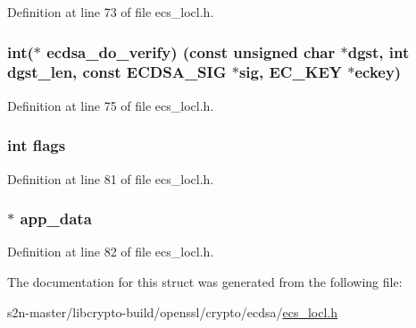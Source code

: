 Definition at line 73 of file ecs\+\_\+locl.\+h.

\subsubsection[{\texorpdfstring{ecdsa\+\_\+do\+\_\+verify}{ecdsa_do_verify}}]{\setlength{\rightskip}{0pt plus 5cm}int($\ast$ ecdsa\+\_\+do\+\_\+verify) (const unsigned char $\ast$dgst, int dgst\+\_\+len, const {\bf E\+C\+D\+S\+A\+\_\+\+S\+IG} $\ast$sig, {\bf E\+C\+\_\+\+K\+EY} $\ast$eckey)}\hypertarget{structecdsa__method_a0a6423be97171faf0d261d54e61f0abb}{}\label{structecdsa__method_a0a6423be97171faf0d261d54e61f0abb}


Definition at line 75 of file ecs\+\_\+locl.\+h.

\subsubsection[{\texorpdfstring{flags}{flags}}]{\setlength{\rightskip}{0pt plus 5cm}int flags}\hypertarget{structecdsa__method_ac8bf36fe0577cba66bccda3a6f7e80a4}{}\label{structecdsa__method_ac8bf36fe0577cba66bccda3a6f7e80a4}


Definition at line 81 of file ecs\+\_\+locl.\+h.

\subsubsection[{\texorpdfstring{app\+\_\+data}{app_data}}]{$\ast$ app\+\_\+data}\hypertarget{structecdsa__method_a02f2e20ee9163913d729eb922b3c672a}{}\label{structecdsa__method_a02f2e20ee9163913d729eb922b3c672a}


Definition at line 82 of file ecs\+\_\+locl.\+h.



The documentation for this struct was generated from the following file\+:\begin{DoxyCompactItemize}
\item 
s2n-\/master/libcrypto-\/build/openssl/crypto/ecdsa/\hyperlink{ecs__locl_8h}{ecs\+\_\+locl.\+h}\end{DoxyCompactItemize}
